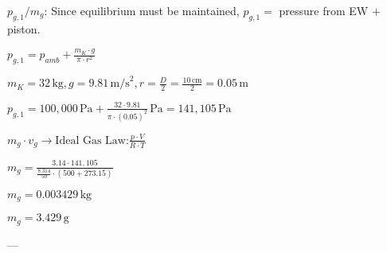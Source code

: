 \( p_{g,1} / m_g \):  
Since equilibrium must be maintained, \( p_{g,1} = \) pressure from EW \( + \) piston.  

\( p_{g,1} = p_{amb} + \frac{m_K \cdot g}{\pi \cdot r^2} \)  

\( m_K = 32 \, \text{kg}, g = 9.81 \, \text{m/s}^2, r = \frac{D}{2} = \frac{10 \, \text{cm}}{2} = 0.05 \, \text{m} \)  

\( p_{g,1} = 100,000 \, \text{Pa} + \frac{32 \cdot 9.81}{\pi \cdot (0.05)^2} \, \text{Pa} = 141,105 \, \text{Pa} \)  

\( m_g \cdot v_g \rightarrow \text{Ideal Gas Law:} \frac{p \cdot V}{R \cdot T} \)  

\( m_g = \frac{3.14 \cdot 141,105}{\frac{8.314}{50} \cdot (500 + 273.15)} \)  

\( m_g = 0.003429 \, \text{kg} \)  

\( m_g = 3.429 \, \text{g} \)  

---